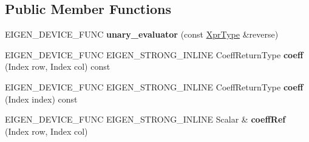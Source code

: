 \subsection*{Public Member Functions}
\begin{DoxyCompactItemize}
\item 
\mbox{\label{struct_eigen_1_1internal_1_1unary__evaluator_3_01_reverse_3_01_arg_type_00_01_direction_01_4_01_4_a477d6b137f0554c53a6b28759c3090d3}} 
E\+I\+G\+E\+N\+\_\+\+D\+E\+V\+I\+C\+E\+\_\+\+F\+U\+NC {\bfseries unary\+\_\+evaluator} (const \mbox{\hyperlink{class_eigen_1_1_reverse}{Xpr\+Type}} \&reverse)
\item 
\mbox{\label{struct_eigen_1_1internal_1_1unary__evaluator_3_01_reverse_3_01_arg_type_00_01_direction_01_4_01_4_af3f1b6dc547152b5e4a64f10b6c0fc2a}} 
E\+I\+G\+E\+N\+\_\+\+D\+E\+V\+I\+C\+E\+\_\+\+F\+U\+NC E\+I\+G\+E\+N\+\_\+\+S\+T\+R\+O\+N\+G\+\_\+\+I\+N\+L\+I\+NE Coeff\+Return\+Type {\bfseries coeff} (Index row, Index col) const
\item 
\mbox{\label{struct_eigen_1_1internal_1_1unary__evaluator_3_01_reverse_3_01_arg_type_00_01_direction_01_4_01_4_a1680f087ebe73a14dbdad18f97d55f18}} 
E\+I\+G\+E\+N\+\_\+\+D\+E\+V\+I\+C\+E\+\_\+\+F\+U\+NC E\+I\+G\+E\+N\+\_\+\+S\+T\+R\+O\+N\+G\+\_\+\+I\+N\+L\+I\+NE Coeff\+Return\+Type {\bfseries coeff} (Index index) const
\item 
\mbox{\label{struct_eigen_1_1internal_1_1unary__evaluator_3_01_reverse_3_01_arg_type_00_01_direction_01_4_01_4_aa1883c5e2d515e520fbc917c3858e355}} 
E\+I\+G\+E\+N\+\_\+\+D\+E\+V\+I\+C\+E\+\_\+\+F\+U\+NC E\+I\+G\+E\+N\+\_\+\+S\+T\+R\+O\+N\+G\+\_\+\+I\+N\+L\+I\+NE Scalar \& {\bfseries coeff\+Ref} (Index row, Index col)
\item 
\mbox{\label{struct_eigen_1_1internal_1_1unary__evaluator_3_01_reverse_3_01_arg_type_00_01_direction_01_4_01_4_a2d4b7bc6bd1fae2f8897807b9e924dbd}} 

\end{DoxyCompactItemize}
